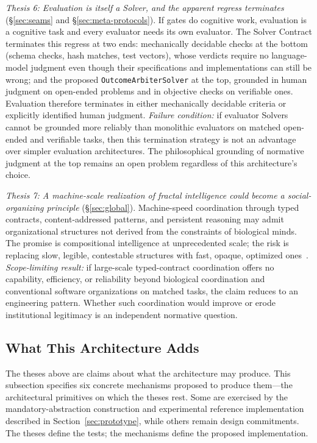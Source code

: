 \documentclass[11pt]{article}
\let\oldtexttt\texttt
\renewcommand{\texttt}[1]{\oldtexttt{\small #1}}
\begin{document}
\emph{Thesis 6: Evaluation is itself a Solver, and the apparent regress terminates} (\S\ref{sec:seams} and \S\ref{sec:meta-protocols}). If gates do cognitive work, evaluation is a cognitive task and every evaluator needs its own evaluator. The Solver Contract terminates this regress at two ends: mechanically decidable checks at the bottom (schema checks, hash matches, test vectors), whose verdicts require no language-model judgment even though their specifications and implementations can still be wrong; and the proposed \texttt{OutcomeArbiterSolver} at the top, grounded in human judgment on open-ended problems and in objective checks on verifiable ones. Evaluation therefore terminates in either mechanically decidable criteria or explicitly identified human judgment. \emph{Failure condition:} if evaluator Solvers cannot be grounded more reliably than monolithic evaluators on matched open-ended and verifiable tasks, then this termination strategy is not an advantage over simpler evaluation architectures. The philosophical grounding of normative judgment at the top remains an open problem regardless of this architecture's choice.

\emph{Thesis 7: A machine-scale realization of fractal intelligence could become a social-organizing principle} (\S\ref{sec:global}). Machine-speed coordination through typed contracts, content-addressed patterns, and persistent reasoning may admit organizational structures not derived from the constraints of biological minds. The promise is compositional intelligence at unprecedented scale; the risk is replacing slow, legible, contestable structures with fast, opaque, optimized ones~\cite{westerberg2026entangled}. \emph{Scope-limiting result:} if large-scale typed-contract coordination offers no capability, efficiency, or reliability beyond biological coordination and conventional software organizations on matched tasks, the claim reduces to an engineering pattern. Whether such coordination would improve or erode institutional legitimacy is an independent normative question.

\subsection{What This Architecture Adds}
\label{sec:adds}

The theses above are claims about what the architecture may produce. This subsection specifies six concrete mechanisms proposed to produce them---the architectural primitives on which the theses rest. Some are exercised by the mandatory-abstraction construction and experimental reference implementation described in Section~\ref{sec:prototype}, while others remain design commitments. The theses define the tests; the mechanisms define the proposed implementation.
\end{document}

